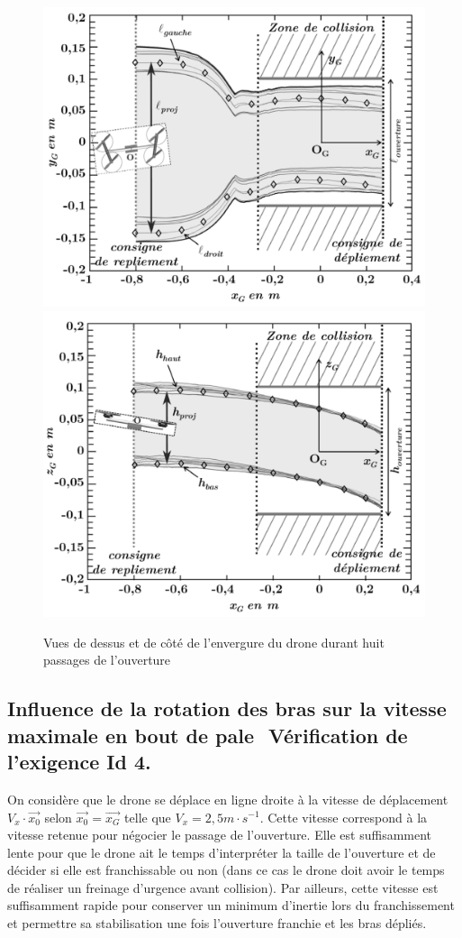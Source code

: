 \begin{figure}[ht!]
\begin{center}
 \includegraphics[width=0.45\linewidth]{img/fig05a}
 \includegraphics[width=0.45\linewidth]{img/fig05b}
\end{center}
\caption{\label{fig05} Vues de dessus et de côté de l'envergure du drone durant huit passages de l'ouverture}
\end{figure}


\subsection{Influence de la rotation des bras sur la vitesse maximale en bout de pale ­ Vérification de l'exigence Id 4.}

On considère que le drone se déplace en ligne droite à la vitesse de déplacement $V_x\cdot \vec{x_0}$ selon $\vec{x_0}=\vec{x_G}$ telle que $V_x=2,5m\cdot s^{-1}$. Cette vitesse correspond à la vitesse retenue pour négocier
le passage de l'ouverture. Elle est suffisamment lente pour que le drone ait le temps d'interpréter la taille de l'ouverture et de décider si elle est franchissable ou non (dans ce cas le drone doit avoir le temps de réaliser un freinage d'urgence avant collision). Par ailleurs, cette vitesse est suffisamment rapide pour conserver un minimum \og d'inertie \fg lors du franchissement et permettre sa stabilisation une fois l'ouverture franchie et les bras dépliés.

